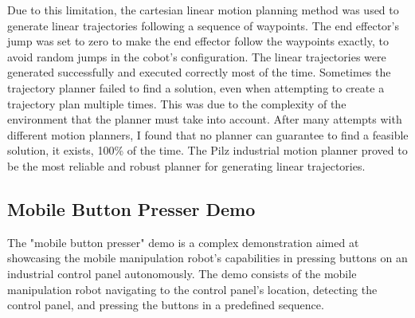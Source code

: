 Due to this limitation, the cartesian linear motion planning method was used to generate linear trajectories
following a sequence of waypoints. The end effector's jump was set to zero to make the end effector follow
the waypoints exactly, to avoid random jumps in the cobot's configuration. The linear trajectories were
generated successfully and executed correctly most of the time. Sometimes the trajectory planner failed
to find a solution, even when attempting to create a trajectory plan multiple times. This was due to the
complexity of the environment that the planner must take into account. After many attempts with 
different motion planners, I found that no planner can guarantee to find a feasible solution,
it exists, 100\% of the time. The Pilz industrial motion planner proved to be the most reliable and
robust planner for generating linear trajectories.


\subsection{Mobile Button Presser Demo}

The "mobile button presser" demo is a complex demonstration aimed at showcasing the mobile manipulation robot's
capabilities in pressing buttons on an industrial control panel autonomously. The demo consists of the mobile
manipulation robot navigating to the control panel's location, detecting the control panel, and pressing the buttons
in a predefined sequence.

